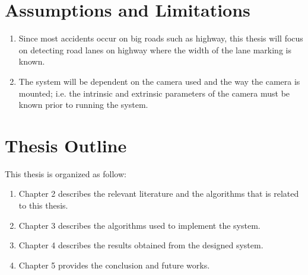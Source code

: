\section{Assumptions and Limitations}
\begin{enumerate}
\item Since most accidents occur on big roads such as highway, this thesis will
focus on detecting road lanes on highway where the width of the lane marking is
known.
\item The system will be dependent on the camera used and the way the camera is
mounted; i.e. the intrinsic and extrinsic parameters of the camera must be
known prior to running the system.
\end{enumerate}

\section {Thesis Outline}
This thesis is organized as follow: 
\begin{enumerate}
  \item Chapter 2 describes the relevant literature and the algorithms that is related to this thesis. 
  \item Chapter 3 describes the algorithms used to implement the system. 
  \item Chapter 4 describes the results obtained from the designed system. 
  \item Chapter 5 provides the conclusion and future works. 
\end{enumerate}

